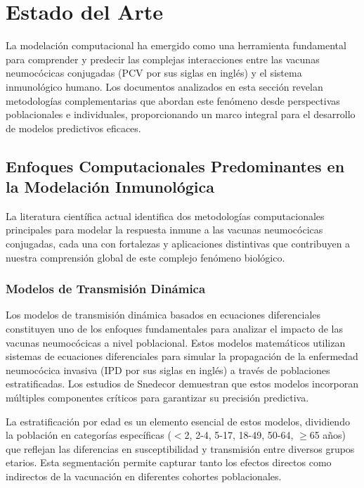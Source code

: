 \chapter{Estado del Arte}\label{chapter:estadoarte}

La modelación computacional ha emergido como una herramienta fundamental para comprender y predecir las complejas interacciones entre las vacunas neumocócicas conjugadas (PCV por sus siglas en inglés) y el sistema inmunológico humano. Los documentos analizados en esta sección revelan metodologías complementarias que abordan este fenómeno desde perspectivas poblacionales e individuales, proporcionando un marco integral para el desarrollo de modelos predictivos eficaces.

\section{Enfoques Computacionales Predominantes en la Modelación Inmunológica}

La literatura científica actual identifica dos metodologías computacionales principales para modelar la respuesta inmune a las vacunas neumocócicas conjugadas, cada una con fortalezas y aplicaciones distintivas que contribuyen a nuestra comprensión global de este complejo fenómeno biológico.

\subsection{Modelos de Transmisión Dinámica}

Los modelos de transmisión dinámica basados en ecuaciones diferenciales constituyen uno de los enfoques fundamentales para analizar el impacto de las vacunas neumocócicas a nivel poblacional. Estos modelos matemáticos utilizan sistemas de ecuaciones diferenciales para simular la propagación de la enfermedad neumocócica invasiva (IPD por sus siglas en inglés) a través de poblaciones estratificadas. Los estudios de Snedecor \cite{Snedecor2020a} demuestran que estos modelos incorporan múltiples componentes críticos para garantizar su precisión predictiva.

La estratificación por edad es un elemento esencial de estos modelos, dividiendo la población en categorías específicas ($<$2, 2-4, 5-17, 18-49, 50-64, $\geq$65 años) que reflejan las diferencias en susceptibilidad y transmisión entre diversos grupos etarios. Esta segmentación permite capturar tanto los efectos directos como indirectos de la vacunación en diferentes cohortes poblacionales.

